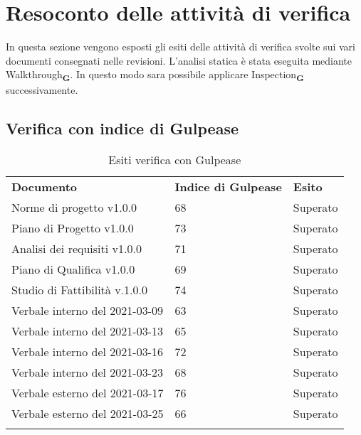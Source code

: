 \section{Resoconto delle attività di verifica}
In questa sezione vengono esposti gli esiti delle attivit\`a di verifica svolte sui vari documenti consegnati nelle revisioni.
L'analisi statica \`e stata eseguita mediante Walkthrough\textsubscript{\textbf{G}}. In questo modo sara possibile applicare Inspection\textsubscript{\textbf{G}} successivamente.
\subsection{Verifica con indice di Gulpease}
\begin{center}
    \centering
    \renewcommand{\arraystretch}{1.8}
    \label{tab:IndiciGulpease}
    \begin{longtable}[!h]{p{150px} p{50px} p{50px}}
        \rowcolor{logo!70}   \textbf{Documento} & \textbf{Indice di Gulpease} & \textbf{Esito} \\
        Norme di progetto v1.0.0            & 68 & Superato \\
        Piano di Progetto v1.0.0            & 73& Superato \\
        Analisi dei requisiti v1.0.0        & 71& Superato \\
        Piano di Qualifica v1.0.0           & 69& Superato \\
        Studio di Fattibilità v.1.0.0       & 74& Superato \\
        Verbale interno del 2021-03-09      & 63& Superato \\
        Verbale interno del 2021-03-13      & 65& Superato \\
        Verbale interno del 2021-03-16      & 72& Superato \\
        Verbale interno del 2021-03-23      & 68& Superato \\
        Verbale esterno del 2021-03-17      & 76& Superato \\
        Verbale esterno del 2021-03-25      & 66& Superato \\
    \rowcolor{white}\caption{Esiti verifica con Gulpease}            
    \end{longtable}    
\end{center}